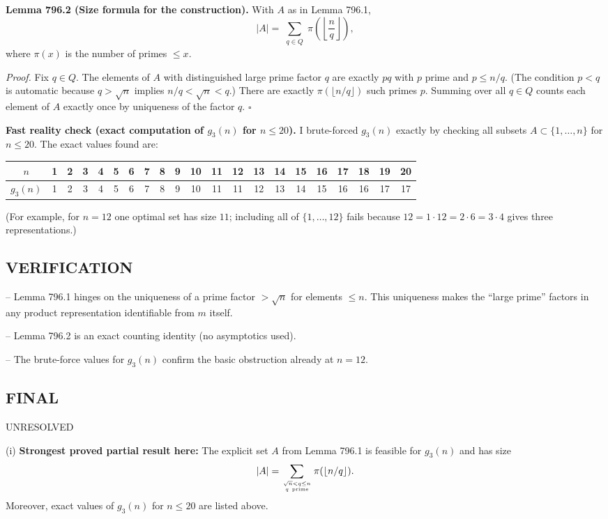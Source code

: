 \medskip
\textbf{Lemma 796.2 (Size formula for the construction).}
With $A$ as in Lemma 796.1,
\[
|A| = \sum_{\substack{q\in Q}} \pi\!\left(\left\lfloor \frac{n}{q}\right\rfloor\right),
\]
where $\pi(x)$ is the number of primes $\le x$.

\emph{Proof.}
Fix $q\in Q$. The elements of $A$ with distinguished large prime factor $q$ are exactly $pq$ with $p$ prime and $p\le n/q$. (The condition $p<q$ is automatic because $q>\sqrt n$ implies $n/q<\sqrt n<q$.)
There are exactly $\pi(\lfloor n/q\rfloor)$ such primes $p$.
Summing over all $q\in Q$ counts each element of $A$ exactly once by uniqueness of the factor $q$.
\hfill$\square$

\medskip
\textbf{Fast reality check (exact computation of $g_3(n)$ for $n\le 20$).}
I brute-forced $g_3(n)$ exactly by checking all subsets $A\subset\{1,\dots,n\}$ for $n\le 20$.
The exact values found are:
\begin{center}
\begin{tabular}{c|cccccccccccccccccccc}
$n$&1&2&3&4&5&6&7&8&9&10&11&12&13&14&15&16&17&18&19&20\\\hline
$g_3(n)$&1&2&3&4&5&6&7&8&9&10&11&11&12&13&14&15&16&16&17&17
\end{tabular}
\end{center}
(For example, for $n=12$ one optimal set has size $11$; including all of $\{1,\dots,12\}$ fails because $12=1\cdot 12=2\cdot 6=3\cdot 4$ gives three representations.)

\subsection*{VERIFICATION}
-- Lemma 796.1 hinges on the uniqueness of a prime factor $>\sqrt n$ for elements $\le n$.
This uniqueness makes the ``large prime'' factors in any product representation identifiable from $m$ itself.

-- Lemma 796.2 is an exact counting identity (no asymptotics used).

-- The brute-force values for $g_3(n)$ confirm the basic obstruction already at $n=12$.

\subsection*{FINAL}
UNRESOLVED

(i) \textbf{Strongest proved partial result here:} The explicit set $A$ from Lemma 796.1 is feasible for $g_3(n)$ and has size
\[|A|=\sum_{\sqrt n<q\le n\atop q\ \mathrm{prime}} \pi(\lfloor n/q\rfloor).
\]
Moreover, exact values of $g_3(n)$ for $n\le 20$ are listed above.

